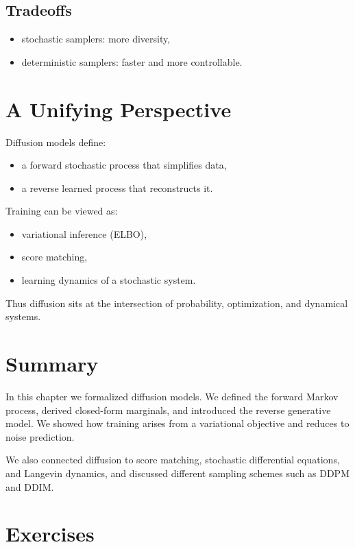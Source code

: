 \subsection{Tradeoffs}

\begin{itemize}
    \item stochastic samplers: more diversity,
    \item deterministic samplers: faster and more controllable.
\end{itemize}

\section{A Unifying Perspective}

Diffusion models define:
\begin{itemize}
    \item a forward stochastic process that simplifies data,
    \item a reverse learned process that reconstructs it.
\end{itemize}

Training can be viewed as:
\begin{itemize}
    \item variational inference (ELBO),
    \item score matching,
    \item learning dynamics of a stochastic system.
\end{itemize}

Thus diffusion sits at the intersection of probability, optimization, and dynamical systems.

\section{Summary}

In this chapter we formalized diffusion models. We defined the forward Markov process, derived closed-form marginals, and introduced the reverse generative model. We showed how training arises from a variational objective and reduces to noise prediction.

We also connected diffusion to score matching, stochastic differential equations, and Langevin dynamics, and discussed different sampling schemes such as DDPM and DDIM.

\section*{Exercises}

